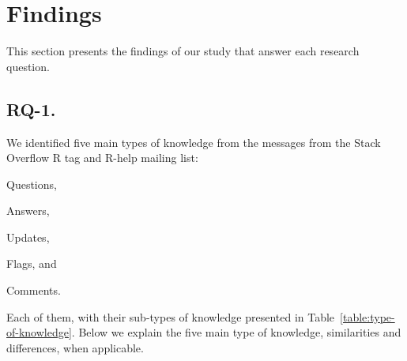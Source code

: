 \section{Findings}
\label{cha:findings}

This section presents the findings of our study that answer each research question.

\subsection{RQ-1. \rqa}
\label{cha:findings-types}

We identified five main types of knowledge from the messages from the Stack Overflow R tag and R-help mailing list:
	\begin{enumerate*}[label=(\arabic*)]
        \item Questions,
        \item Answers,
        \item Updates,
        \item Flags, and
        \item Comments.
	\end{enumerate*}
    Each of them, with their sub-types of knowledge presented in Table~\ref{table:type-of-knowledge}.
    Below we explain the five main type of knowledge, similarities and differences, when applicable.

